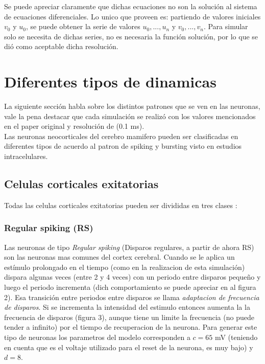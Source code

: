 \documentclass[12pt]{article}
\begin{document}
Se puede apreciar claramente que dichas ecuaciones no son la solución al sistema de ecuaciones diferenciales. Lo unico que proveen es: partiendo de valores iniciales $v_0$ y $u_0$,
se puede obtener la serie de valores $u_0,...,u_n$ y $v_0,...,v_n$. Para simular solo se necesita de dichas series, no es necesaria la función solución, por lo que se dió como aceptable dicha resolución.

\section{Diferentes tipos de dinamicas}

La siguiente sección habla sobre los distintos patrones que se ven en las neuronas, vale la pena destacar que cada simulación se realizó con los valores
mencionados en el paper original y resolución de (0.1 ms). \\

Las neuronas neocorticales del cerebro mamifero pueden ser clasificadas en diferentes tipos de acuerdo al patron de spiking y bursting visto en estudios intracelulares. \\

\subsection{Celulas corticales exitatorias}
Todas las celulas corticales exitatorias pueden ser divididas en tres clases \cite{firingPatters} \cite{chatteringCells}:

\newpage
\subsubsection{Regular spiking (RS)}
Las neuronas de tipo \textit{Regular spiking} (Disparos regulares, a partir de ahora RS) son las neuronas mas comunes del cortex cerebral. Cuando se le aplica un estímulo prolongado en el tiempo (como en la realizacion de esta simulación)
dispara algunas veces (entre 2 y 4 veces) con un periodo entre disparos pequeño y luego el periodo incrementa (dich comportamiento se puede apreciar en al figura 2). Esa transición entre periodos entre disparos se llama \textit{adaptacion de frecuencia de disparos}.
Si se incrementa la intensidad del estimulo entonces aumenta la la frecuencia de disparos (figura 3), aunque tiene un limite la frecuencia (no puede tender a infinito) por el tiempo de recuperacion de la neurona.
Para generar este tipo de neuronas los parametros del modelo corresponden a $c = 65$ mV (teniendo en cuenta que
es el voltaje utilizado para el reset de la neurona, es muy bajo) y $d=8$.
\end{document}
